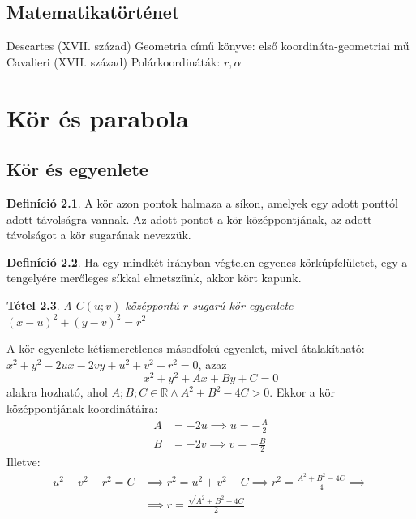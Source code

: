 \documentclass[twoside,12pt]{report}
\newtheorem{theorem}{Tétel}[section]
\theoremstyle{definition}
\newtheorem{definition}[theorem]{Definíció}
\begin{document}
\section{Matematikatörténet}
	\begin{outline}
		\1 Descartes (XVII. század)
			\2 Geometria című könyve: első koordináta-geometriai mű
		\1 Cavalieri (XVII. század)
			\2 Polárkoordináták: $r,\alpha$
	\end{outline}
\chapter{Kör és parabola}
\section{Kör és egyenlete}
	\begin{definition}
		A kör azon pontok halmaza a síkon, amelyek egy adott ponttól adott távolságra vannak.
		Az adott pontot a kör középpontjának, az adott távolságot a kör sugarának nevezzük.
	\end{definition}
	\begin{definition}
		Ha egy mindkét irányban végtelen egyenes körkúpfelületet, egy a tengelyére merőleges síkkal elmetszünk, akkor kört kapunk.
	\end{definition}
	\begin{theorem}
		A $C(u;v)$ középpontú $r$ sugarú kör egyenlete $(x-u)^2+(y-v)^2=r^2$
	\end{theorem}
	A kör egyenlete kétismeretlenes másodfokú egyenlet, mivel átalakítható: $x^2+y^2-2ux-2vy+u^2+v^2-r^2=0$, azaz
	\begin{equation*}
		x^2+y^2+Ax+By+C=0
	\end{equation*}
	alakra hozható, ahol $A;B;C\in\mathbb{R}\wedge A^2+B^2-4C>0$. Ekkor a kör középpontjának koordinátáira:
	\begin{align*}
		A&=-2u\implies u=-\frac{A}{2}\\
		B&=-2v\implies v=-\frac{B}{2}
	\end{align*}
	Illetve:
	\begin{align*}
		u^2+v^2-r^2=C&\implies r^2=u^2+v^2-C\implies r^2=\frac{A^2+B^2-4C}{4}\implies \\&\implies r=\frac{\sqrt{A^2+B^2-4C}}{2}
	\end{align*}
\end{document}
